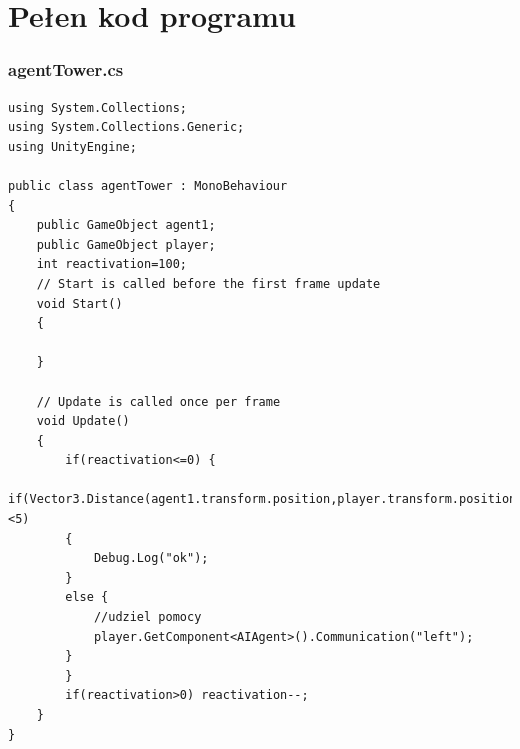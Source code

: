 \documentclass[12pt,a4paper]{article}
\begin{document}
	\newpage
	\section*{Pełen kod programu}
	\subsubsection{agentTower.cs}
	\begin{lstlisting}
using System.Collections;
using System.Collections.Generic;
using UnityEngine;

public class agentTower : MonoBehaviour
{
	public GameObject agent1;
	public GameObject player;
	int reactivation=100;
    // Start is called before the first frame update
    void Start()
    {
        
    }

    // Update is called once per frame
    void Update()
    {
		if(reactivation<=0) {
         if(Vector3.Distance(agent1.transform.position,player.transform.position)<5)
		{
			Debug.Log("ok");
		}
		else {
			//udziel pomocy
			player.GetComponent<AIAgent>().Communication("left");
		}
		}
		if(reactivation>0) reactivation--;
    }
}

	\end{lstlisting}
\end{document}
